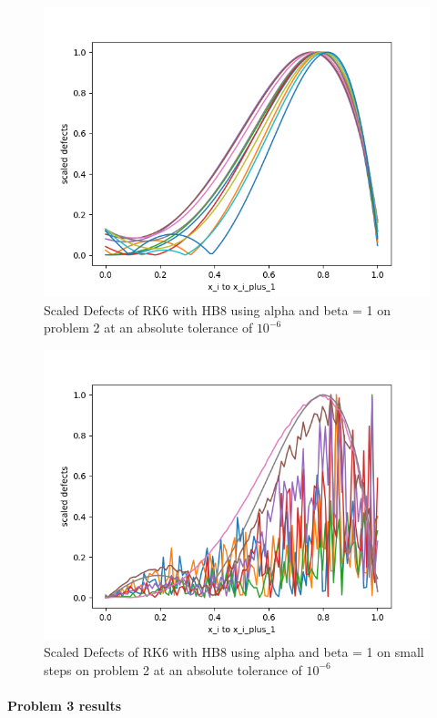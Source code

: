 \documentclass{article}
\begin{document}
\begin{figure}[H]
\centering
\includegraphics[width=0.7\linewidth]{./figures/static_alpha_rk6_with_hb8_p2_scaled_defects}
\caption{Scaled Defects of RK6 with HB8 using alpha and beta = 1 on problem 2 at an absolute tolerance of $10^{-6}$}
\label{fig:static_alpha_rk6_with_hb8_p2_scaled_defects}
\end{figure}

\begin{figure}[H]
\centering
\includegraphics[width=0.7\linewidth]{./figures/static_alpha_rk6_with_hb8_p2_scaled_defects_small_steps}
\caption{Scaled Defects of RK6 with HB8 using alpha and beta = 1 on small steps on problem 2 at an absolute tolerance of $10^{-6}$}
\label{fig:static_alpha_rk6_with_hb8_p2_scaled_defects_small_steps}
\end{figure}

\paragraph{Problem 3 results}
\end{document}
